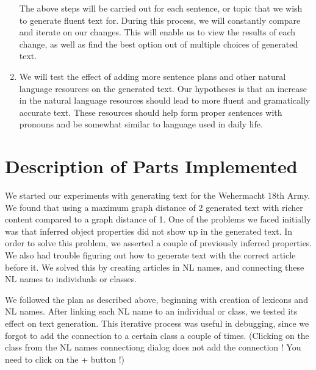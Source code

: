 \documentclass[12pt, letterpaper]{article}
\begin{document}
\begin{enumerate}
      The above steps will be carried out for each sentence, or topic that we wish to generate fluent text for.
      During this process, we will constantly compare and iterate on our changes.
      This will enable us to view the results of each change, as well as find the best option out of multiple choices
      of generated text.

  		\item
      We will test the effect of adding more sentence plans and other natural language resources on the generated text.
      Our hypotheses is that an increase in the natural language resources should lead to more fluent and gramatically
      accurate text.    
      These resources should help form proper sentences with pronouns and be somewhat similar to language used in 
      daily life.
  		
  	
  	\end{enumerate}
  
  \pagebreak

  \section*{Description of Parts Implemented}

    We started our experiments with generating text for the Wehermacht 18th Army. 
    We found that using a maximum graph distance of 2 generated text with richer content compared to a graph distance of 1.
    One of the problems we faced initially was that inferred object properties did not show up in the generated text. 
    In order to solve this problem, we asserted a couple of previously inferred properties.
    We also had trouble figuring out how to generate text with the correct article before it. 
    We solved this by creating articles in NL names, and connecting these NL names to individuals or classes.

    \vspace{4mm}

    \noindent
    We followed the plan as described above, beginning with creation of lexicons and NL names.
    After linking each NL name to an individual or class, we tested its effect on text generation.
    This iterative process was useful in debugging, since we forgot to add the connection to a certain class a couple of
    times. (Clicking on the class from the NL names connectiong dialog does not add the connection ! You need to click 
    on the + button !)

    \vspace{4mm}
\end{document}
